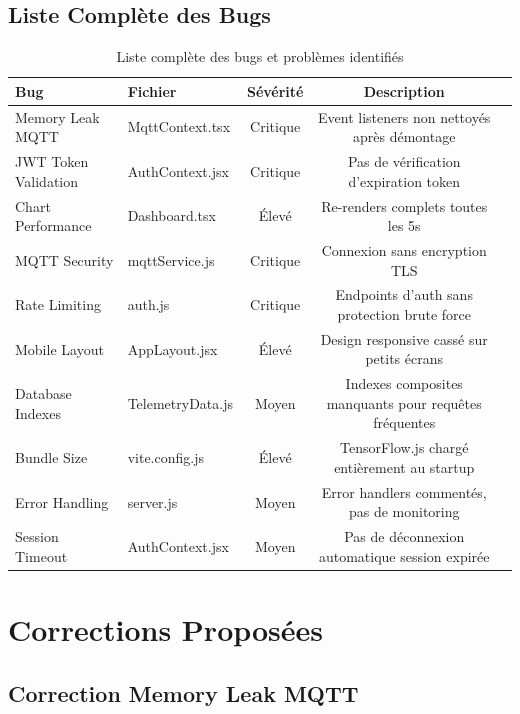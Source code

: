 \documentclass[a4paper,12pt]{article}
\begin{document}
\subsection{Liste Complète des Bugs}

\begin{table}[h]
\centering
\small
\begin{tabular}{|p{2cm}|p{1.5cm}|c|c|p{4cm}|}
\hline
\rowcolor{alertred!20}
\textbf{Bug} & \textbf{Fichier} & \textbf{Sévérité} & \textbf{Description} \\
\hline
Memory Leak MQTT & MqttContext.tsx & Critique & Event listeners non nettoyés après démontage \\
\hline
JWT Token Validation & AuthContext.jsx & Critique & Pas de vérification d'expiration token \\
\hline
Chart Performance & Dashboard.tsx & Élevé & Re-renders complets toutes les 5s \\
\hline
MQTT Security & mqttService.js & Critique & Connexion sans encryption TLS \\
\hline
Rate Limiting & auth.js & Critique & Endpoints d'auth sans protection brute force \\
\hline
Mobile Layout & AppLayout.jsx & Élevé & Design responsive cassé sur petits écrans \\
\hline
Database Indexes & TelemetryData.js & Moyen & Indexes composites manquants pour requêtes fréquentes \\
\hline
Bundle Size & vite.config.js & Élevé & TensorFlow.js chargé entièrement au startup \\
\hline
Error Handling & server.js & Moyen & Error handlers commentés, pas de monitoring \\
\hline
Session Timeout & AuthContext.jsx & Moyen & Pas de déconnexion automatique session expirée \\
\hline
\end{tabular}
\caption{Liste complète des bugs et problèmes identifiés}
\end{table}

\section{Corrections Proposées}

\subsection{Correction Memory Leak MQTT}
\end{document}
